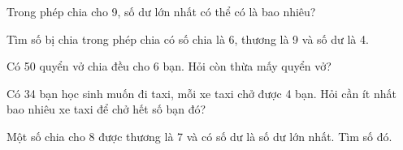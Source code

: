 \begin{ex} %
Trong phép chia cho 9, số dư lớn nhất có thể có là bao nhiêu?
\end{ex}

\begin{ex} %
Tìm số bị chia trong phép chia có số chia là 6, thương là 9 và số dư là 4.
\end{ex}

\begin{ex} %
Có 50 quyển vở chia đều cho 6 bạn. Hỏi còn thừa mấy quyển vở?
\end{ex}

\begin{ex} %
Có 34 bạn học sinh muốn đi taxi, mỗi xe taxi chở được 4 bạn. Hỏi cần ít nhất bao nhiêu xe taxi để chở hết số bạn đó?
\end{ex}

\begin{ex} %
Một số chia cho 8 được thương là 7 và có số dư là số dư lớn nhất. Tìm số đó.
\end{ex}
